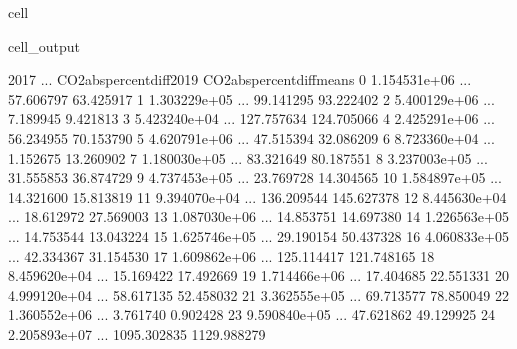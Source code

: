 \documentclass[letterpaper,10pt,english]{jupyterBook}
\begin{document}
\begin{sphinxuseclass}{cell}
\begin{sphinxVerbatimOutput}
\begin{sphinxuseclass}{cell_output}
\begin{sphinxVerbatim}[commandchars=\\\{\}]
            2017  ...  CO2\PYGZus{}abs\PYGZus{}percent\PYGZus{}diff\PYGZus{}2019  CO2\PYGZus{}abs\PYGZus{}percent\PYGZus{}diff\PYGZus{}means  \PYGZbs{}
0   1.154531e+06  ...                  57.606797                   63.425917   
1   1.303229e+05  ...                  99.141295                   93.222402   
2   5.400129e+06  ...                   7.189945                    9.421813   
3   5.423240e+04  ...                 127.757634                  124.705066   
4   2.425291e+06  ...                  56.234955                   70.153790   
5   4.620791e+06  ...                  47.515394                   32.086209   
6   8.723360e+04  ...                   1.152675                   13.260902   
7   1.180030e+05  ...                  83.321649                   80.187551   
8   3.237003e+05  ...                  31.555853                   36.874729   
9   4.737453e+05  ...                  23.769728                   14.304565   
10  1.584897e+05  ...                  14.321600                   15.813819   
11  9.394070e+04  ...                 136.209544                  145.627378   
12  8.445630e+04  ...                  18.612972                   27.569003   
13  1.087030e+06  ...                  14.853751                   14.697380   
14  1.226563e+05  ...                  14.753544                   13.043224   
15  1.625746e+05  ...                  29.190154                   50.437328   
16  4.060833e+05  ...                  42.334367                   31.154530   
17  1.609862e+06  ...                 125.114417                  121.748165   
18  8.459620e+04  ...                  15.169422                   17.492669   
19  1.714466e+06  ...                  17.404685                   22.551331   
20  4.999120e+04  ...                  58.617135                   52.458032   
21  3.362555e+05  ...                  69.713577                   78.850049   
22  1.360552e+06  ...                   3.761740                    0.902428   
23  9.590840e+05  ...                  47.621862                   49.129925   
24  2.205893e+07  ...                1095.302835                 1129.988279   


\end{sphinxVerbatim}
\end{sphinxuseclass}
\end{sphinxVerbatimOutput}
\end{sphinxuseclass}
\end{document}
